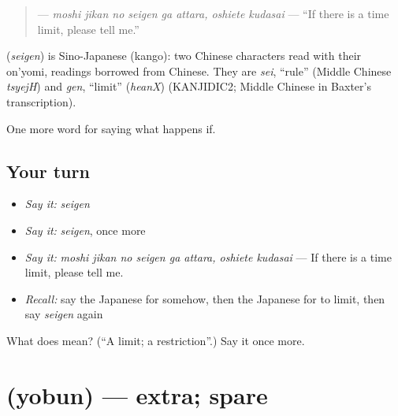 \begin{quote}
\textbf{    } — \emph{moshi jikan no seigen ga attara, oshiete kudasai} — \textquotedblleft{}If there is a time limit, please tell me.\textquotedblright{}
\end{quote}

\begin{cousinweb}
\textbf{} (\emph{seigen}) is Sino-Japanese (kango): two Chinese characters read with their on'yomi, readings borrowed from Chinese. They are \emph{sei}, \textquotedblleft{}rule\textquotedblright{} (Middle Chinese \emph{tsyejH}) and \emph{gen}, \textquotedblleft{}limit\textquotedblright{} (\emph{heanX}) (KANJIDIC2; Middle Chinese in Baxter's transcription).
\end{cousinweb}

\begin{grammarlens}[title={What you've built}]
One more word for saying what happens if.
\end{grammarlens}

\subsection*{Your turn}
\begin{itemize}
\raggedright
  \item \emph{Say it:} \emph{seigen}
  \item \emph{Say it:} \emph{seigen}, once more
  \item \emph{Say it:} \emph{moshi jikan no seigen ga attara, oshiete kudasai} — If there is a time limit, please tell me.
  \item \emph{Recall:} say the Japanese for somehow, then the Japanese for to limit, then say \emph{seigen} again
\end{itemize}

\begin{tcolorbox}[breakable,colback=teal!4,colframe=teal!35!black,title={Before you move on}]
What does  mean? (\textquotedblleft{}A limit; a restriction\textquotedblright{}.) Say it once more.
\end{tcolorbox}
\section[\texorpdfstring{\ja{よぶん} (yobun)}{よぶん (yobun)}]{ (yobun) — extra; spare}

\label{lesson:JA-C532-yobun}



